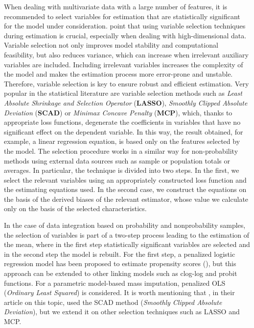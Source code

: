 \documentclass[
]{jss}
\begin{document}
When dealing with multivariate data with a large number of features, it
is recommended to select variables for estimation that are statistically
significant for the model under consideration.
\citet{yang_asymptotic_2020} point that using variable selection
techniques during estimation is crucial, especially when dealing with
high-dimensional data. Variable selection not only improves model
stability and computational feasibility, but also reduces variance,
which can increase when irrelevant auxiliary variables are included.
Including irrelevant variables increases the complexity of the model and
makes the estimation process more error-prone and unstable. Therefore,
variable selection is key to ensure robust and efficient estimation.
Very popular in the statistical literature are variable selection
methods such as \textit{Least Absolute Shrinkage and Selection Operator}
(\textbf{LASSO}), \textit{Smoothly Clipped Absolute Deviation}
(\textbf{SCAD}) or \textit{Minimax Concave Penalty} (\textbf{MCP}),
which, thanks to appropriate loss functions, degenerate the coefficients
in variables that have no significant effect on the dependent variable.
In this way, the result obtained, for example, a linear regression
equation, is based only on the features selected by the model. The
selection procedure works in a similar way for non-probability methods
using external data sources such as sample or population totals or
averages. In particular, the technique is divided into two steps. In the
first, we select the relevant variables using an appropriately
constructed loss function and the estimating equations used. In the
second case, we construct the equations on the basis of the derived
biases of the relevant estimator, whose value we calculate only on the
basis of the selected characteristics.

In the case of data integration based on probability and nonprobability
samples, the selection of variables is part of a two-step process
leading to the estimation of the mean, where in the first step
statistically significant variables are selected and in the second step
the model is rebuilt. For the first step, a penalized logistic
regression model has been proposed to estimate propensity scores
(\citet{yang_doubly_2020}), but this approach can be extended to other
linking models such as clog-log and probit functions. For a parametric
model-based mass imputation, penalized OLS
(\textit{Ordinary Least Squared}) is considered. It is worth mentioning
that \citet{yang_asymptotic_2020}, in their article on this topic, used
the SCAD method (\textit{Smoothly Clipped Absolute Deviation}), but we
extend it on other selection techniques such as LASSO and MCP.
\end{document}
